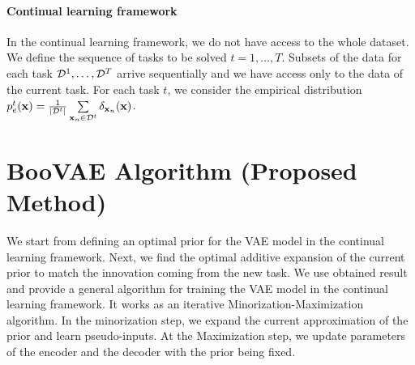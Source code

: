 \paragraph{Continual learning framework} In the continual learning framework, we do not have access to the whole dataset. We define the sequence of tasks to be solved $t=1,\dots,T$. Subsets of the data for each task $\mathcal{D}^1, \dots ,\mathcal{D}^T$ arrive sequentially and we have access only to the data of the current task. For each task $t$, we consider the empirical distribution $p_{e}^{t}({\mathbf{x}})=\tfrac{1}{|\mathcal{D}^{t}|}\sum\limits_{{\mathbf{x}}_n\in\mathcal{D}^t}\delta_{{\mathbf{x}}_n}({\mathbf{x}})$.
\section{BooVAE Algorithm (Proposed Method)}
\label{sec:boovae}
We start from defining an optimal prior for the VAE model in the continual learning framework. Next, we find the optimal additive expansion of the current prior to match the innovation coming from the new task. We use obtained result and provide a general algorithm for training the VAE model in the continual learning framework. It works as an iterative Minorization-Maximization algorithm. In the minorization step, we expand the current approximation of the prior and learn pseudo-inputs. At the Maximization step, we update parameters of the encoder and the decoder with the prior being fixed.
